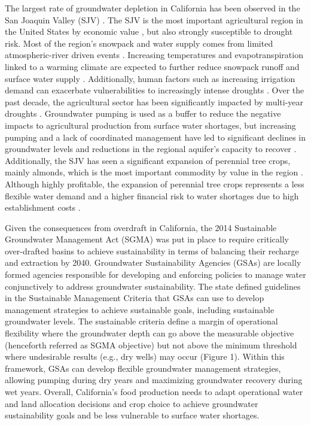 \documentclass[a4paper,fleqn]{cas-sc}
\begin{document}
The largest rate of groundwater depletion in California has been observed in the San Joaquin Valley (SJV) \citep{ojha_sustained_2018}. The SJV is the most important agricultural region in the United States by economic value \citep{usda_national_2020}, but also strongly susceptible to drought risk. Most of the region’s snowpack and water supply comes from limited atmospheric-river driven events \citep{espinoza_global_2018}. Increasing temperatures and evapotranspiration linked to a warming climate are expected to further reduce snowpack runoff and surface water supply \citep{fernandez-bou_regional_2021,vahmani_will_2022}. Additionally, human factors such as increasing irrigation demand can exacerbate vulnerabilities to increasingly intense droughts \citep{he_intensification_2017}. Over the past decade, the agricultural sector has been significantly impacted by multi-year droughts \citep{lund_lessons_2018,medellin-azuara_economic_2022}. Groundwater pumping is used as a buffer to reduce the negative impacts to agricultural production from surface water shortages, but increasing pumping and a lack of coordinated management have led to significant declines in groundwater levels and reductions in the regional aquifer's capacity to recover \citep{liu_groundwater_2022}.  Additionally, the SJV has seen a significant expansion of perennial tree crops, mainly almonds, which is the most important commodity by value in the region \citep{usda_national_2020}. Although highly profitable, the expansion of perennial tree crops represents a less flexible water demand and a higher financial risk to water shortages due to high establishment costs \citep{mall_water_2019,qin_flexibility_2019}.   

Given the consequences from overdraft in California, the 2014 Sustainable Groundwater Management Act (SGMA) \citep{dwr_sustainable_2021} was put in place to require critically over-drafted basins to achieve sustainability in terms of balancing their recharge and extraction by 2040. Groundwater Sustainability Agencies (GSAs) are locally formed agencies responsible for developing and enforcing policies to manage water conjunctively to address groundwater sustainability. The state defined guidelines in the Sustainable Management Criteria \citep{dwr_sustainable_2017} that GSAs can use to develop management strategies to achieve sustainable goals, including sustainable groundwater levels. The sustainable criteria define a margin of operational flexibility where the groundwater depth can go above the measurable objective (henceforth referred as SGMA objective) but not above the minimum threshold where undesirable results (e.g., dry wells) may occur (Figure 1). Within this framework, GSAs can develop flexible groundwater management strategies, allowing pumping during dry years and maximizing groundwater recovery during wet years. Overall, California's food production needs to adapt operational water and land allocation decisions and crop choice to achieve groundwater sustainability goals and be less vulnerable to surface water shortages. 
\end{document}
